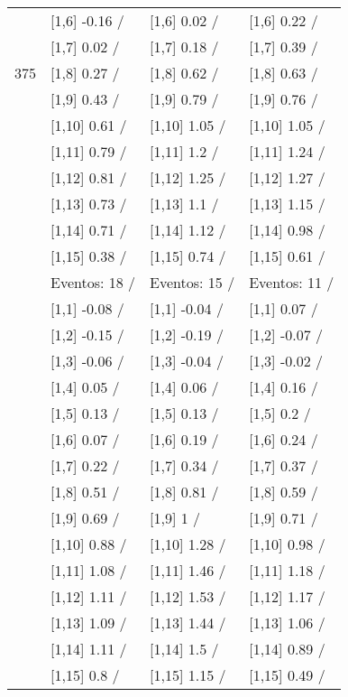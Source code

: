 \begin{table}
\begin{tabular}[t]{llll}
 & {}[1,6] -0.16  / & {}[1,6] 0.02  / & {}[1,6] 0.22  /\\
 & {}[1,7] 0.02  / & {}[1,7] 0.18  / & {}[1,7] 0.39  /\\
375 & {}[1,8] 0.27  / & {}[1,8] 0.62  / & {}[1,8] 0.63  /\\
\addlinespace
 & {}[1,9] 0.43  / & {}[1,9] 0.79  / & {}[1,9] 0.76  /\\
 & {}[1,10] 0.61  / & {}[1,10] 1.05  / & {}[1,10] 1.05  /\\
 & {}[1,11] 0.79  / & {}[1,11] 1.2  / & {}[1,11] 1.24  /\\
 & {}[1,12] 0.81  / & {}[1,12] 1.25  / & {}[1,12] 1.27  /\\
 & {}[1,13] 0.73  / & {}[1,13] 1.1  / & {}[1,13] 1.15  /\\
\addlinespace
 & {}[1,14] 0.71  / & {}[1,14] 1.12  / & {}[1,14] 0.98  /\\
 & {}[1,15] 0.38  / & {}[1,15] 0.74  / & {}[1,15] 0.61  /\\
 & Eventos:  18 / & Eventos:  15 / & Eventos:  11 /\\
 & {}[1,1] -0.08  / & {}[1,1] -0.04  / & {}[1,1] 0.07  /\\
 & {}[1,2] -0.15  / & {}[1,2] -0.19  / & {}[1,2] -0.07  /\\
\addlinespace
 & {}[1,3] -0.06  / & {}[1,3] -0.04  / & {}[1,3] -0.02  /\\
 & {}[1,4] 0.05  / & {}[1,4] 0.06  / & {}[1,4] 0.16  /\\
 & {}[1,5] 0.13  / & {}[1,5] 0.13  / & {}[1,5] 0.2  /\\
 & {}[1,6] 0.07  / & {}[1,6] 0.19  / & {}[1,6] 0.24  /\\
 & {}[1,7] 0.22  / & {}[1,7] 0.34  / & {}[1,7] 0.37  /\\
\addlinespace
500 & {}[1,8] 0.51  / & {}[1,8] 0.81  / & {}[1,8] 0.59  /\\
 & {}[1,9] 0.69  / & {}[1,9] 1  / & {}[1,9] 0.71  /\\
 & {}[1,10] 0.88  / & {}[1,10] 1.28  / & {}[1,10] 0.98  /\\
 & {}[1,11] 1.08  / & {}[1,11] 1.46  / & {}[1,11] 1.18  /\\
 & {}[1,12] 1.11  / & {}[1,12] 1.53  / & {}[1,12] 1.17  /\\
\addlinespace
 & {}[1,13] 1.09  / & {}[1,13] 1.44  / & {}[1,13] 1.06  /\\
 & {}[1,14] 1.11  / & {}[1,14] 1.5  / & {}[1,14] 0.89  /\\
 & {}[1,15] 0.8  / & {}[1,15] 1.15  / & {}[1,15] 0.49  /\\
\bottomrule
\end{tabular}
\end{table}
